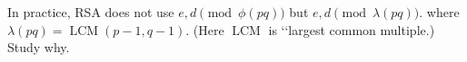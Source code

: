   In practice, RSA does not use $e, d \pmod{\phi(pq)}$ but $e,d \pmod{\lambda(pq)}$.
  where
  $\lambda(pq) = \operatorname{LCM}(p - 1, q - 1)$.
  (Here $\operatorname{LCM}$ is \lq\lq largest common multiple.)
  Study why.
